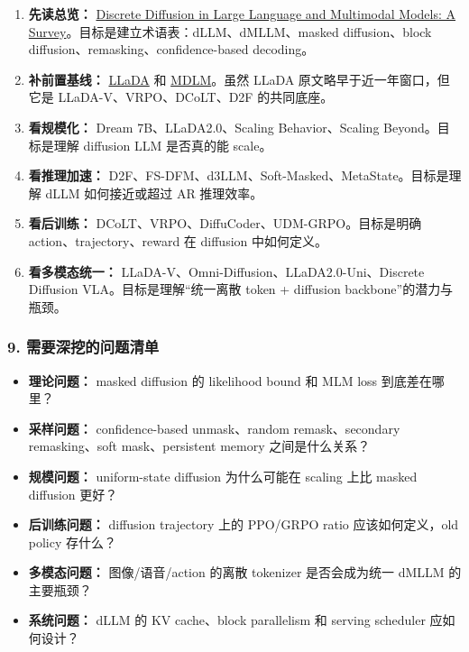 \begin{enumerate}[leftmargin=1.5em]
  \item \textbf{先读总览：} \href{https://arxiv.org/abs/2506.13759}{Discrete Diffusion in Large Language and Multimodal Models: A Survey}。目标是建立术语表：dLLM、dMLLM、masked diffusion、block diffusion、remasking、confidence-based decoding。
  \item \textbf{补前置基线：} \href{https://arxiv.org/abs/2502.09992}{LLaDA} 和 \href{https://arxiv.org/abs/2406.07524}{MDLM}。虽然 LLaDA 原文略早于近一年窗口，但它是 LLaDA-V、VRPO、DCoLT、D2F 的共同底座。
  \item \textbf{看规模化：} Dream 7B、LLaDA2.0、Scaling Behavior、Scaling Beyond。目标是理解 diffusion LLM 是否真的能 scale。
  \item \textbf{看推理加速：} D2F、FS-DFM、d3LLM、Soft-Masked、MetaState。目标是理解 dLLM 如何接近或超过 AR 推理效率。
  \item \textbf{看后训练：} DCoLT、VRPO、DiffuCoder、UDM-GRPO。目标是明确 action、trajectory、reward 在 diffusion 中如何定义。
  \item \textbf{看多模态统一：} LLaDA-V、Omni-Diffusion、LLaDA2.0-Uni、Discrete Diffusion VLA。目标是理解“统一离散 token + diffusion backbone”的潜力与瓶颈。
\end{enumerate}

\subsubsection{9. 需要深挖的问题清单}

\begin{itemize}[leftmargin=1.5em]
  \item \textbf{理论问题：} masked diffusion 的 likelihood bound 和 MLM loss 到底差在哪里？
  \item \textbf{采样问题：} confidence-based unmask、random remask、secondary remasking、soft mask、persistent memory 之间是什么关系？
  \item \textbf{规模问题：} uniform-state diffusion 为什么可能在 scaling 上比 masked diffusion 更好？
  \item \textbf{后训练问题：} diffusion trajectory 上的 PPO/GRPO ratio 应该如何定义，old policy 存什么？
  \item \textbf{多模态问题：} 图像/语音/action 的离散 tokenizer 是否会成为统一 dMLLM 的主要瓶颈？
  \item \textbf{系统问题：} dLLM 的 KV cache、block parallelism 和 serving scheduler 应如何设计？
\end{itemize}


